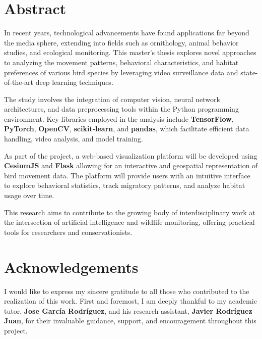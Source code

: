 
\chapter*{Abstract}
\thispagestyle{empty}

In recent years, technological advancements have found applications far beyond the media sphere, extending into fields such as ornithology, animal behavior studies, and ecological monitoring. This master's thesis explores novel approaches to analyzing the movement patterns, behavioral characteristics, and habitat preferences of various bird species by leveraging video surveillance data and state-of-the-art deep learning techniques.

The study involves the integration of computer vision, neural network architectures, and data preprocessing tools within the Python programming environment. Key libraries employed in the analysis include \textbf{TensorFlow}, \textbf{PyTorch}, \textbf{OpenCV}, \textbf{scikit-learn}, and \textbf{pandas}, which facilitate efficient data handling, video analysis, and model training.

As part of the project, a web-based visualization platform will be developed using \textbf{CesiumJS} and \textbf{Flask} allowing for an interactive and geospatial representation of bird movement data. The platform will provide users with an intuitive interface to explore behavioral statistics, track migratory patterns, and analyze habitat usage over time.

This research aims to contribute to the growing body of interdisciplinary work at the intersection of artificial intelligence and wildlife monitoring, offering practical tools for researchers and conservationists.


\cleardoublepage %
\chapter*{Acknowledgements}


\thispagestyle{empty}
\vspace{1cm}

I would like to express my sincere gratitude to all those who contributed to the realization of this work. First and foremost, I am deeply thankful to my academic tutor, \textbf{Jose García Rodríguez}, and his research assistant, \textbf{Javier Rodríguez Juan}, for their invaluable guidance, support, and encouragement throughout this project.

